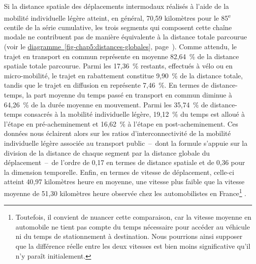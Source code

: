 \begin{refsegment}
Si la distance spatiale des déplacements intermodaux réalisés à l'aide de la mobilité individuelle légère atteint, en général, 70,59 kilomètres pour le 85\textsuperscript{e} centile de la série cumulative, les trois segments qui composent cette chaîne modale ne contribuent pas de manière équivalente à la distance totale parcourue (voir le \hyperref[fig-chap5:distances-globales]{diagramme~\ref{fig-chap5:distances-globales}}, page~\pageref{fig-chap5:distances-globales}). Comme attendu, le trajet en transport en commun représente en moyenne 82,64~\% de la distance spatiale totale parcourue. Parmi les 17,36~\% restants, effectués à vélo ou en micro-mobilité, le trajet en rabattement constitue 9,90~\% de la distance totale, tandis que le trajet en diffusion en représente 7,46~\%. En termes de distance-temps, la part moyenne du temps passé en transport en commun diminue à 64,26~\% de la durée moyenne en mouvement. Parmi les 35,74~\% de distance-temps consacrés à la mobilité individuelle légère, 19,12~\% du temps est alloué à l'étape en pré-acheminement et 16,62~\% à l'étape en post-acheminement. Ces données nous éclairent alors sur les ratios d'interconnectivité de la mobilité individuelle légère associée au transport public~–~dont la formule s'appuie sur la division de la distance de chaque segment par la distance globale du déplacement~–~de l'ordre de 0,17 en termes de distance spatiale et de 0,36 pour la dimension temporelle. Enfin, en termes de vitesse de déplacement, celle-ci atteint 40,97 kilomètres heure en moyenne, une vitesse plus faible que la vitesse moyenne de 51,30 kilomètres heure observée chez les automobilistes en France\footnote{
    Toutefois, il convient de nuancer cette comparaison, car la vitesse moyenne en automobile ne tient pas compte du temps nécessaire pour accéder au véhicule ni du temps de stationnement à destination. Nous pourrions ainsi supposer que la différence réelle entre les deux vitesses est bien moins significative qu'il n'y paraît initialement.
} \textcolor{blue}{\autocite{onisr_observatoire_2022}}.%


\end{refsegment}
